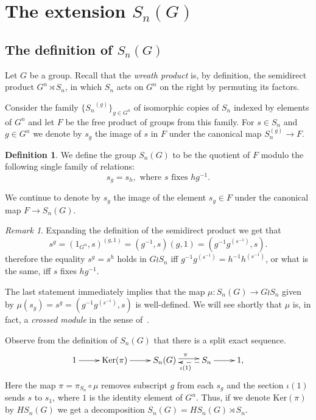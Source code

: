 \documentclass[oneside, 12pt]{amsart}
\theoremstyle{plain}
\numberwithin{equation}{section}
\numberwithin{lemma}{section}
\theoremstyle{remark}
\newtheorem{rem}[lemma]{Remark}
\theoremstyle{definition}
\newtheorem{df}[lemma]{Definition} \Crefname{df}{Definition}{Definitions}
\begin{document}
\section{The extension $S_n(G)$} 
\subsection{The definition of $S_n(G)$} \label{sec:QnG-def}
Let $G$ be a group. Recall that the {\it wreath product} is, by definition,
 the semidirect product $G^n \rtimes S_n$, in which $S_n$ acts on $G^n$ on the right by permuting its factors.

Consider the family $\{{S_n}^{(g)}\}_{g\in G^n}$ of isomorphic copies of $S_n$ indexed by elements of $G^n$ and let $F$ be the free product of groups from this family.
For $s\in S_n$ and $g\in G^n$ we denote by 
$s_{g}$ the image of $s$ in $F$ under the canonical map $S_n^{(g)} \to F$.

\begin{df} We define the group $S_n(G)$ to be the quotient of $F$ modulo the following single family of relations:
\begin{equation} \label{eq:main_rel} s_g = s_h, \text{ where $s$ fixes $h g^{-1}$.} \end{equation} \end{df}

We continue to denote by $s_g$ the image of the element $s_g\in F$ under the canonical map $F\to S_n(G)$.

\begin{rem}
Expanding the definition of the semidirect product we get that
\begin{equation} \nonumber s^g = (1_{G^n}, s)^{(g, 1)} = (g^{-1}, s) (g, 1) = (g^{-1} g^{(s^{-1})}, s). \end{equation}
therefore the equality $s^g = s^h$ holds in $G \wr S_n$ iff
$g^{-1} g^{(s^{-1})} = h^{-1} h^{(s^{-1})}$, or what is the same, iff $s$ fixes $hg^{-1}$.

The last statement immediately implies that the map $\mu \colon S_n(G) \to G \wr S_n$ given by $\mu(s_g) = s^g = (g^{-1}g^{(s^{-1})}, s)$
is well-defined. We will see shortly that $\mu$ is, in fact, a {\it crossed module} in the sense of~\cite[\S~2.2]{BHS11}.
\end{rem}

Observe from the definition of $S_n(G)$ that there is a split exact sequence.
\begin{equation} \label{eq:ex-seq} \xymatrix{1 \ar[r] & \mathrm{Ker}(\pi) \ar[r] &  S_n(G) \ar@<0.5ex>[r]^{\pi} & S_n \ar[r] \ar@{-->}@<0.5ex>[l]^{\iota(1)} & 1,} \end{equation}
Here the map $\pi = \pi_{S_n} \circ \mu$ removes subscript $g$ from each $s_g$ and the section $\iota(1)$ sends $s$ to $s_1$, where $1$ is the identity element of $G^n$.
Thus, if we denote $\mathrm{Ker}(\pi)$ by $HS_n(G)$ we get a decomposition $S_n(G) = HS_n(G) \rtimes S_n$.
\end{document}
